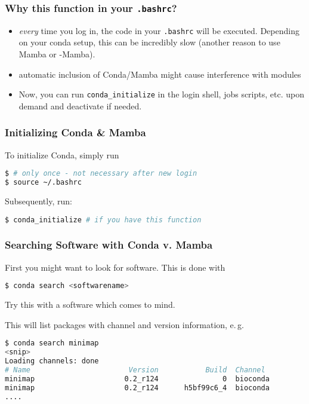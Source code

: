 \begin{frame}[fragile]
  \frametitle{Why this function in your \texttt{.bashrc}?}
  \begin{docs}
  	\begin{itemize}[<+->]
  		\item \emph{every} time you log in, the code in your \texttt{.bashrc} will be executed. Depending on your conda setup, this can be incredibly slow (another reason to use Mamba or \textmu-Mamba).
  		\item automatic inclusion of Conda/Mamba might cause interference with modules
  		\item Now, you can run \verb+conda_initialize+ in the login shell, jobs scripts, etc. upon demand and deactivate if needed.
  	\end{itemize}
  \end{docs}
\end{frame}

\begin{frame}[fragile]
  \frametitle{Initializing Conda \& Mamba}
  To initialize Conda, simply run

  \begin{lstlisting}[language=Bash, style=Shell]
$ # only once - not necessary after new login
$ source ~/.bashrc 
  \end{lstlisting}
  Subsequently, run: 
  \begin{lstlisting}[language=Bash, style=Shell]
$ conda_initialize # if you have this function
  \end{lstlisting}
\end{frame}



\begin{frame}[fragile]
  \frametitle{Searching Software with Conda v. Mamba}
  First you might want to look for software. This is done with
  \begin{lstlisting}[language=Bash, style=Shell]
$ conda search <softwarename>
  \end{lstlisting}
  \pause
  \begin{task}
  	Try this with a software which comes to mind.
  \end{task}
  \pause
  This will list packages with channel and version information, e.\,g.
  \begin{lstlisting}[language=Bash, style=Shell, basicstyle=\tiny]
$ conda search minimap
<snip>
Loading channels: done
# Name                       Version           Build  Channel             
minimap                     0.2_r124               0  bioconda            
minimap                     0.2_r124      h5bf99c6_4  bioconda
....
  \end{lstlisting}
\end{frame}


